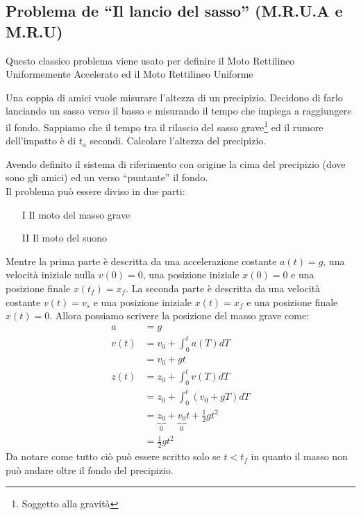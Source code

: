     \subsection{Problema de ``Il lancio del sasso'' (M.R.U.A e M.R.U)}
        Questo classico problema viene usato per definire il Moto Rettilineo Uniformemente Accelerato ed il Moto Rettilineo Uniforme
        \begin{problem}
            Una coppia di amici vuole misurare l'altezza di un precipizio. Decidono di farlo lanciando un sasso verso il basso e misurando il tempo che impiega a raggiungere il fondo. Sappiamo che il tempo tra il rilascio del sasso grave\footnote{Soggetto alla gravità} ed il rumore dell'impatto è di $t_a$ secondi.\newline
            Calcolare l'altezza del precipizio.
        \end{problem}
        Avendo definito il sistema di riferimento con origine la cima del precipizio (dove sono gli amici) ed un verso ``puntante'' il fondo.\\
        Il problema può essere diviso in due parti:
        \begin{enumerate}
            \item[I] Il moto del masso grave
            \item[II] Il moto del suono
        \end{enumerate}
        Mentre la prima parte è descritta da una accelerazione costante $a(t)=g$, una velocità iniziale nulla $v(0)=0$, una posizione iniziale $x(0)=0$ e una posizione finale $x(t_f)=x_f$. La seconda parte è descritta da una velocità costante $v(t)=v_s$ e una posizione iniziale $x(t)=x_f$ e una posizione finale $x(t)=0$. Allora possiamo scrivere la posizione del masso grave come:
        $$
            \begin{aligned}
                a&=g\\
                v(t)&=v_0+\int_0^t a(T)dT \\
                &= v_0 + gt\\
                z(t)&=z_0+\int_0^t v(T)dT\\ 
                &= z_0 + \int_0^t(v_0 + gT )dT \\ 
                &= \underbrace{z_0}_0 + \underbrace{v_0}_0t + \frac{1}{2}gt^2\\
                &= \frac{1}{2}gt^2
            \end{aligned}
        $$
        Da notare come tutto ciò può essere scritto solo se $t<t_f$ in quanto il masso non può andare oltre il fondo del precipizio.\\
